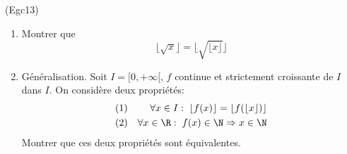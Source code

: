 \begin{tiny}(Egc13)\end{tiny}
\begin{enumerate}
 \item Montrer que
\begin{displaymath}
 \lfloor \sqrt{x} \rfloor = \lfloor \sqrt{\lfloor x \rfloor } \rfloor  
\end{displaymath}
\item Généralisation. Soit $I=[0,+\infty[$, $f$ continue et strictement croissante de $I$ dans $I$.
On considère deux propriétés:
\begin{align*}
  (1)& &\forall x \in I:\; \lfloor f(x) \rfloor = \lfloor f(\lfloor x \rfloor) \rfloor \\
  (2)& &\forall x \in \R:\; f(x)\in \N \Rightarrow x\in \N
\end{align*}
Montrer que ces deux propriétés sont équivalentes.
\end{enumerate}
